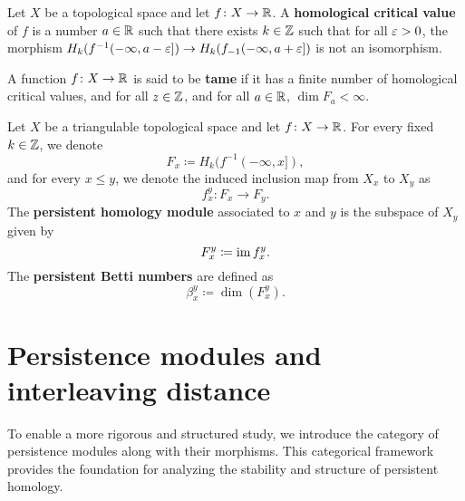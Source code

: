 \begin{definition} \label{def:critical-value}
    Let $ X $ be a topological space and let $ f\colon X \to \mathbb R $. A {\bf homological critical value} of $ f $ is a number $ a \in \mathbb R $ such that there exists $k \in \mathbb Z$ such that for all 
    $ \varepsilon > 0 $, the morphism $ H_k(f^{-1}(-\infty, a - \varepsilon]) \to H_k(f_{-1}(-\infty, a + \varepsilon]) $ is not an isomorphism.
\end{definition}

\begin{definition} \label{def:tame-function}
    A function $ f\colon X \to \mathbb R $ is said to be {\bf tame} if it has a finite number of homological critical values, and for all $ z \in \mathbb Z $, and for all $ a \in \mathbb R $, $ \dim F_a < \infty $.
\end{definition}

\begin{definition} \label{def:persistent-homology}
    Let $X$ be a triangulable topological space and let $ f \colon X \to \mathbb R $. For every fixed $ k \in \mathbb Z $, we denote
    \begin{equation}
        F_x \coloneq H_k(f^{-1}(-\infty, x]),
    \end{equation}
    and for every $ x \leq y $, we denote the induced inclusion map from $ X_x $ to $ X_y $ as
    \begin{equation}
        f_x^y \colon F_x \to F_y.
    \end{equation}
    The {\bf persistent homology module} associated to $ x $ and $ y $ is the subspace of $X_y$ given by 
    \begin{equation}
        F_x^y \coloneq \operatorname{im} f_x^y.
    \end{equation}
    The {\bf persistent Betti numbers} are defined as
    \begin{equation}
        \beta_x^y \coloneq \dim(F_x^y).
    \end{equation}
\end{definition}

\section{Persistence modules and interleaving distance} \label{sec:preliminaries-modules}

To enable a more rigorous and structured study, we introduce the category of persistence modules along with their morphisms. This categorical framework provides the foundation for analyzing the stability and structure of persistent homology.

